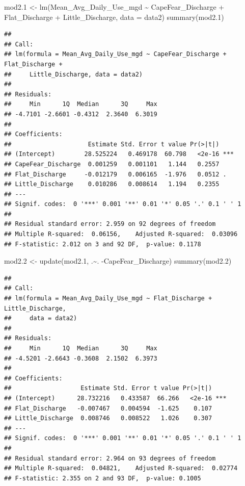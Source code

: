 \documentclass[
  12pt,
]{article}
\newenvironment{Shaded}{\begin{snugshade}}{\end{snugshade}}
\newcommand{\AttributeTok}[1]{\textcolor[rgb]{0.77,0.63,0.00}{#1}}
\newcommand{\FloatTok}[1]{\textcolor[rgb]{0.00,0.00,0.81}{#1}}
\newcommand{\FunctionTok}[1]{\textcolor[rgb]{0.00,0.00,0.00}{#1}}
\newcommand{\NormalTok}[1]{#1}
\newcommand{\OtherTok}[1]{\textcolor[rgb]{0.56,0.35,0.01}{#1}}
\newcommand{\SpecialCharTok}[1]{\textcolor[rgb]{0.00,0.00,0.00}{#1}}
\begin{document}
\begin{Shaded}
\begin{Highlighting}[]
\NormalTok{mod2}\FloatTok{.1} \OtherTok{\textless{}{-}} \FunctionTok{lm}\NormalTok{(Mean\_Avg\_Daily\_Use\_mgd }\SpecialCharTok{\textasciitilde{}}\NormalTok{ CapeFear\_Discharge }\SpecialCharTok{+}\NormalTok{ Flat\_Discharge }\SpecialCharTok{+} 
\NormalTok{               Little\_Discharge, }\AttributeTok{data =}\NormalTok{ data2)}
\FunctionTok{summary}\NormalTok{(mod2}\FloatTok{.1}\NormalTok{)}
\end{Highlighting}
\end{Shaded}

\begin{verbatim}
## 
## Call:
## lm(formula = Mean_Avg_Daily_Use_mgd ~ CapeFear_Discharge + Flat_Discharge + 
##     Little_Discharge, data = data2)
## 
## Residuals:
##     Min      1Q  Median      3Q     Max 
## -4.7101 -2.6601 -0.4312  2.3640  6.3019 
## 
## Coefficients:
##                     Estimate Std. Error t value Pr(>|t|)    
## (Intercept)        28.525224   0.469178  60.798   <2e-16 ***
## CapeFear_Discharge  0.001259   0.001101   1.144   0.2557    
## Flat_Discharge     -0.012179   0.006165  -1.976   0.0512 .  
## Little_Discharge    0.010286   0.008614   1.194   0.2355    
## ---
## Signif. codes:  0 '***' 0.001 '**' 0.01 '*' 0.05 '.' 0.1 ' ' 1
## 
## Residual standard error: 2.959 on 92 degrees of freedom
## Multiple R-squared:  0.06156,    Adjusted R-squared:  0.03096 
## F-statistic: 2.012 on 3 and 92 DF,  p-value: 0.1178
\end{verbatim}

\begin{Shaded}
\begin{Highlighting}[]
\NormalTok{mod2}\FloatTok{.2} \OtherTok{\textless{}{-}} \FunctionTok{update}\NormalTok{(mod2}\FloatTok{.1}\NormalTok{, .}\SpecialCharTok{\textasciitilde{}}\NormalTok{. }\SpecialCharTok{{-}}\NormalTok{CapeFear\_Discharge)}
\FunctionTok{summary}\NormalTok{(mod2}\FloatTok{.2}\NormalTok{)}
\end{Highlighting}
\end{Shaded}

\begin{verbatim}
## 
## Call:
## lm(formula = Mean_Avg_Daily_Use_mgd ~ Flat_Discharge + Little_Discharge, 
##     data = data2)
## 
## Residuals:
##     Min      1Q  Median      3Q     Max 
## -4.5201 -2.6643 -0.3608  2.1502  6.3973 
## 
## Coefficients:
##                   Estimate Std. Error t value Pr(>|t|)    
## (Intercept)      28.732216   0.433587  66.266   <2e-16 ***
## Flat_Discharge   -0.007467   0.004594  -1.625    0.107    
## Little_Discharge  0.008746   0.008522   1.026    0.307    
## ---
## Signif. codes:  0 '***' 0.001 '**' 0.01 '*' 0.05 '.' 0.1 ' ' 1
## 
## Residual standard error: 2.964 on 93 degrees of freedom
## Multiple R-squared:  0.04821,    Adjusted R-squared:  0.02774 
## F-statistic: 2.355 on 2 and 93 DF,  p-value: 0.1005
\end{verbatim}
\end{document}
